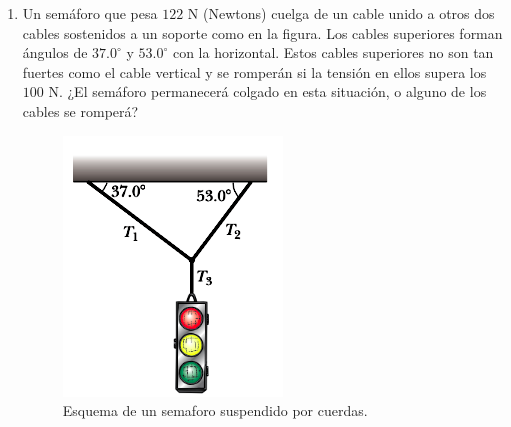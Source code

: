 \documentclass{article}
\begin{document}
\begin{enumerate}
\item Un semáforo que pesa $122$ N (Newtons) cuelga de un cable unido a otros dos cables sostenidos a un soporte como en la figura. Los cables superiores forman ángulos de $37$.$0^{\circ}$ y $53$.$0^{\circ}$ con la horizontal. Estos cables superiores no son tan fuertes como el cable vertical y se romperán si la tensión en ellos supera los
$100$ N. ¿El semáforo permanecerá colgado en esta situación, o alguno de los cables se romperá?

\begin{figure}[H]
\centering
\includegraphics[scale=0.4]{problema_4.png}
\caption{Esquema de un semaforo suspendido por cuerdas.}
\end{figure}

\end{enumerate}
\end{document}
